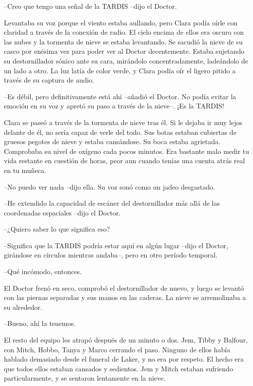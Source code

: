 {--Creo que tengo una señal de la TARDIS
--dijo el Doctor.}

{Levantaba su voz porque el viento estaba aullando, pero Clara podía
 oírle con claridad a través de la conexión de radio. El cielo encima de
 ellos era oscuro con las nubes y la tormenta de nieve se estaba
 levantando. Se sacudió la nieve de su casco por enésima vez para poder
 ver al Doctor decentemente. Estaba sujetando su destornillador sónico
 ante su cara, mirándolo concentradamente, ladeándolo de un lado a otro.
 La luz latía de color verde, y Clara podía oír el ligero pitido a través
de su captura de audio.}

{--Es débil, pero definitivamente está ahí --añadió el Doctor. No podía
 evitar la emoción en su voz y apretó su paso a través de la nieve--. ¡Es
la TARDIS!}

{Clara se paseó a través de la tormenta de nieve tras él. Si le dejaba ir
 muy lejos delante de él, no sería capaz de verle del todo. Sus botas
 estaban cubiertas de gruesos pegotes de nieve y estaba cansándose. Su
 boca estaba agrietada. Comprobaba su nivel de oxígeno cada pocos
 minutos. Era bastante malo medir tu vida restante en cuestión de horas,
peor aun cuando tenías una cuenta atrás real en tu muñeca.}

{--No puedo ver nada --dijo ella. Su voz sonó como un jadeo desgastado.}

{--He extendido la capacidad de escáner del destornillador más allá de
las coordenadas espaciales --dijo el Doctor.}

{--¿Quiero saber lo que significa eso?}

{--Significa que la TARDIS podría estar aquí en algún lugar --dijo el
 Doctor, girándose en círculos mientras andaba--, pero en otro período
temporal.}

{--Qué incómodo, entonces.}

{El Doctor frenó en seco, comprobó el destornillador de nuevo, y luego se
 levantó con las piernas separadas y sus manos en las caderas. La nieve
se arremolinaba a su alrededor.}

{--Bueno, ahí la tenemos.}

{El resto del equipo les atrapó después de un minuto o dos. Jem, Tibby y
 Balfour, con Mitch, Hobbo, Tanya y Marco cerrando el paso. Ninguno de
 ellos había hablado demasiado desde el funeral de Laker, y no era por
 respeto. El hecho era que todos ellos estaban cansados y sedientos. Jem
 y Mitch estaban sufriendo particularmente, y se sentaron lentamente en
la nieve.}

